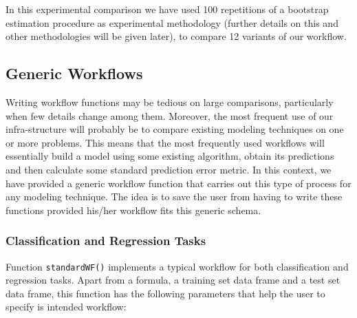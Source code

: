 \documentclass[10pt,a4paper]{article}\usepackage[]{graphicx}\usepackage[]{color}
\begin{document}
In this experimental comparison we have used 100 repetitions of a
bootstrap estimation procedure as experimental methodology (further
details on this and other methodologies will be given later), to
compare 12 variants of our workflow. 

\subsection{Generic Workflows}

Writing workflow functions may be tedious on large comparisons,
particularly when few details change among them. Moreover, the most
frequent use of our infra-structure will probably be to compare
existing modeling techniques on one or more problems. This means that
the most frequently used workflows will essentially build a model
using some existing algorithm, obtain its predictions and then
calculate some standard prediction error metric. In this context, we
have provided a generic workflow function that carries out this type
of process for any modeling technique. The idea is to save the user
from having to write these functions provided his/her workflow fits
this generic schema.

\subsubsection{Classification and Regression Tasks}

Function \texttt{standardWF()} implements a typical workflow for both
classification and regression tasks. Apart from a formula, a training set data frame and a test set data frame, this function has the following parameters that help the user to specify is intended workflow:
\end{document}
